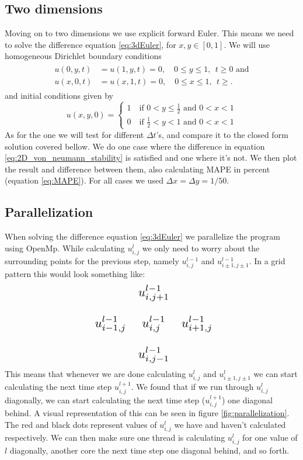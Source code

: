 \documentclass[reprint, english,notitlepage,nofootinbib]{revtex4-1}  %
\begin{document}
\subsection{Two dimensions}
Moving on to two dimensions we use explicit forward Euler. This means we need to solve the difference equation \eqref{eq:3dEuler}, for $x, y \in [0,1]$. We will use homogeneous Dirichlet boundary conditions
\begin{align}
	\label{eq:2D_bound}
	\begin{split}
	u(0, y, t) &= u(1, y, t) = 0, \quad 0\leq y \leq 1, \ \ t\geq 0 \text{ and}\\
	u(x, 0, t) &= u(x, 1, t) = 0, \quad 0\leq x \leq 1, \ \ t\geq.
	\end{split}
\end{align}
and initial conditions given by
\begin{equation}
\label{eq:2D_init}
	u(x,y,0) =
	\begin{cases}
	1\quad \text{if }0<y\leq \frac{1}{2}\text{ and } 0<x<1 \\
	0\quad \text{if }\frac{1}{2}<y<1\text{ and } 0<x<1
	\end{cases}
\end{equation}
As for the one we will test for different $\Delta t$'s, and compare it to the closed form solution covered bellow. We do one case where the difference in equation \eqref{eq:2D_von_neumann_stability} is satisfied and one where it's not. We then plot the result and difference between them, also calculating MAPE in percent (equation \eqref{eq:MAPE}). For all cases we used $\Delta x= \Delta y = 1/50$.

\subsection*{Parallelization}
When solving the difference equation \eqref{eq:3dEuler} we parallelize the program using OpenMp. While calculating $u_{i,j}^l$ we only need to worry about the surrounding points for the previous step, namely $u_{i,j}^{l-1}$ and $u_{i\pm 1,j\pm 1}^{l-1}$. In a grid pattern this would look something like:
\begin{equation*}
\scalebox{1.5}{
	$\begin{matrix}
	& u_{i,j+1}^{l-1} & \\
	\\
	u_{i-1,j}^{l-1} & u_{i,j}^{l-1} & u_{i+1,j}^{l-1} \\
	\\
	& u_{i,j-1}^{l-1} &
	\end{matrix}$}
\end{equation*}
This means that whenever we are done calculating $u_{i,j}^{l}$ and $u_{i\pm 1,j\pm 1}^{l}$ we can start calculating the next time step $u_{i,j}^{l+1}$. We found that if we run through $u_{i,j}^{l}$ diagonally, we can start calculating the next time step ($u_{i,j}^{l+1}$) one diagonal behind. A visual representation of this can be seen in figure \ref{fig:parallelization}. The red and black dots represent values of $u_{i,j}^l$ we have and haven't calculated respectively. We can then make sure one thread is calculating $u_{i,j}^l$ for one value of $l$ diagonally, another core the next time step one diagonal behind, and so forth.
\end{document}
